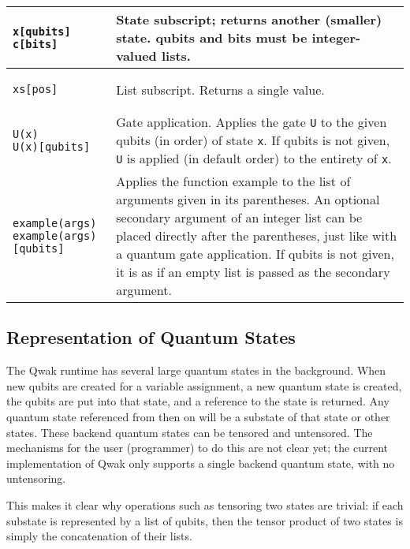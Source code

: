 \documentclass{article}
\begin{document}
\begin{center}
\begin{tabular}{| l | m{11cm} |}
\begin{lstlisting}
x[qubits]
c[bits]
\end{lstlisting} & State subscript; returns another (smaller) state. qubits and bits must be integer-valued lists. \\ \hline
\begin{lstlisting}
xs[pos]
\end{lstlisting} & List subscript. Returns a single value. \\ \hline
\begin{lstlisting}
U(x)
U(x)[qubits]
\end{lstlisting} & Gate application. Applies the gate \lstinline$U$ to the given qubits (in order) of state \lstinline$x$. If qubits is not given, \lstinline$U$ is applied (in default order) to the entirety of \lstinline$x$. \\ \hline
\begin{lstlisting}
example(args)
example(args)[qubits]
\end{lstlisting} & Applies the function example to the list of arguments given in its parentheses. An optional secondary argument of an integer list can be placed directly after the parentheses, just like with a quantum gate application. If qubits is not given, it is as if an empty list is passed as the secondary argument. \\ \hline
\end{tabular}
\end{center}

\subsection{Representation of Quantum States}

The Qwak runtime has several large quantum states in the background. When new qubits are created for a variable assignment, a new quantum state is created, the qubits are put into that state, and a reference to the state is returned. Any quantum state referenced from then on will be a substate of that state or other states. These backend quantum states can be tensored and untensored. The mechanisms for the user (programmer) to do this are not clear yet; the current implementation of Qwak only supports a single backend quantum state, with no untensoring.

This makes it clear why operations such as tensoring two states are trivial: if each substate is represented by a list of qubits, then the tensor product of two states is simply the concatenation of their lists.
\end{document}
